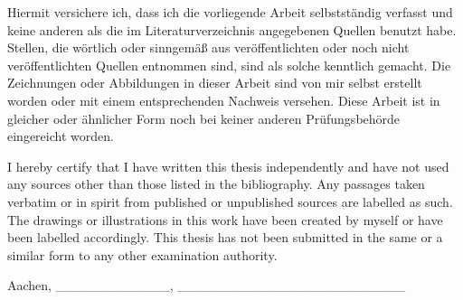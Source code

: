 Hiermit versichere ich, dass ich die vorliegende Arbeit selbstständig
verfasst und keine anderen als die im Literaturverzeichnis angegebenen
Quellen benutzt habe. Stellen, die wörtlich oder sinngemäß aus
veröffentlichten oder noch nicht veröffentlichten Quellen entnommen
sind, sind als solche kenntlich gemacht. Die Zeichnungen oder
Abbildungen in dieser Arbeit sind von mir selbst erstellt worden oder
mit einem entsprechenden Nachweis versehen. Diese Arbeit ist in gleicher
oder ähnlicher Form noch bei keiner anderen Prüfungsbehörde eingereicht
worden.

I hereby certify that I have written this thesis independently and have
not used any sources other than those listed in the bibliography. Any
passages taken verbatim or in spirit from published or unpublished
sources are labelled as such. The drawings or illustrations in this work
have been created by myself or have been labelled accordingly. This
thesis has not been submitted in the same or a similar form to any other
examination authority.

Aachen, \datum  \_\_\_\_\_\_\_\_\_\_\_\_,
\_\_\_\_\_\_\_\_\_\_\_\_\_\_\_\_\_\_\_\_\_\_\_\_
